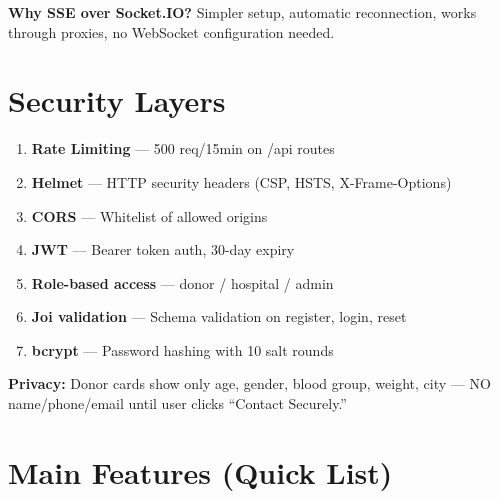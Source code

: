 \documentclass[10pt,a4paper]{article}
\begin{document}
\textbf{Why SSE over Socket.IO?} Simpler setup, automatic reconnection, works through proxies, no WebSocket configuration needed.

\section{Security Layers}

\begin{enumerate}
    \item \textbf{Rate Limiting} --- 500 req/15min on /api routes
    \item \textbf{Helmet} --- HTTP security headers (CSP, HSTS, X-Frame-Options)
    \item \textbf{CORS} --- Whitelist of allowed origins
    \item \textbf{JWT} --- Bearer token auth, 30-day expiry
    \item \textbf{Role-based access} --- donor / hospital / admin
    \item \textbf{Joi validation} --- Schema validation on register, login, reset
    \item \textbf{bcrypt} --- Password hashing with 10 salt rounds
\end{enumerate}

\textbf{Privacy:} Donor cards show only age, gender, blood group, weight, city --- NO name/phone/email until user clicks ``Contact Securely.''

\section{Main Features (Quick List)}
\end{document}
